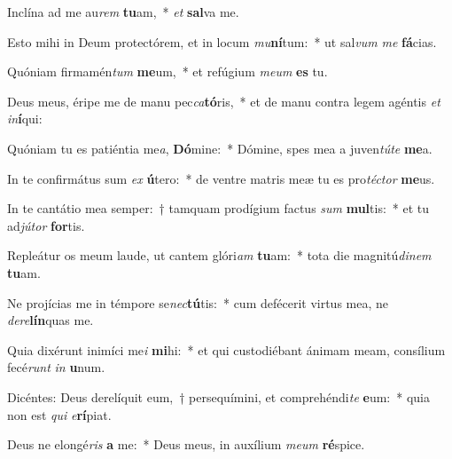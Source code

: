 \item Inclína ad me au\textit{rem} \textbf{tu}am,~* \textit{et} \textbf{sal}va me.
\item Esto mihi in Deum protectórem, et in locum \textit{mu}\textbf{ní}tum:~* ut sal\textit{vum} \textit{me} \textbf{fá}cias.
\item Quóniam firmamén\textit{tum} \textbf{me}um,~* et refúgium \textit{me}\textit{um} \textbf{es} tu.
\item Deus meus, éripe me de manu pec\textit{ca}\textbf{tó}ris,~* et de manu contra legem agéntis \textit{et} \textit{in}\textbf{í}qui:
\item Quóniam tu es patiéntia me\textit{a}, \textbf{Dó}mine:~* Dómine, spes mea a juven\textit{tú}\textit{te} \textbf{me}a.
\item In te confirmátus sum \textit{ex} \textbf{ú}tero:~* de ventre matris meæ tu es pro\textit{téc}\textit{tor} \textbf{me}us.
\item In te cantátio mea semper:~† tamquam prodígium factus \textit{sum} \textbf{mul}tis:~* et tu ad\textit{jú}\textit{tor} \textbf{for}tis.
\item Repleátur os meum laude, ut cantem glóri\textit{am} \textbf{tu}am:~* tota die magnitú\textit{di}\textit{nem} \textbf{tu}am.
\item Ne projícias me in témpore se\textit{nec}\textbf{tú}tis:~* cum defécerit virtus mea, ne \textit{de}\textit{re}\textbf{lín}quas me.
\item Quia dixérunt inimíci me\textit{i} \textbf{mi}hi:~* et qui custodiébant ánimam meam, consílium fecé\textit{runt} \textit{in} \textbf{u}num.
\item Dicéntes: Deus derelíquit eum,~† persequímini, et comprehéndi\textit{te} \textbf{e}um:~* quia non est \textit{qui} \textit{e}\textbf{rí}piat.
\item Deus ne elongé\textit{ris} \textbf{a} me:~* Deus meus, in auxílium \textit{me}\textit{um} \textbf{ré}spice.

